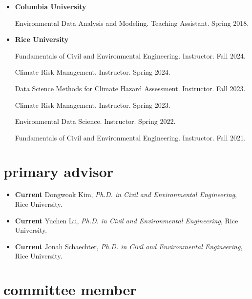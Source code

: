 \documentclass[10pt,oneside]{article}
\begin{document}
\begin{itemize}[label={}]
  
  \item \textbf{Columbia University}
        
        Environmental Data Analysis and Modeling. Teaching Assistant. Spring 2018.
        
        
  \item \textbf{Rice University}
        
        Fundamentals of Civil and Environmental Engineering. Instructor. Fall 2024.
        
        Climate Risk Management. Instructor. Spring 2024.
        
        Data Science Methods for Climate Hazard Assessment. Instructor. Fall 2023.
        
        Climate Risk Management. Instructor. Spring 2023.
        
        Environmental Data Science. Instructor. Spring 2022.
        
        Fundamentals of Civil and Environmental Engineering. Instructor. Fall 2021.
        
        
\end{itemize}


\section{primary advisor}

\mbox{}\vspace{-\dimexpr\baselineskip\relax}

\begin{itemize}[label={}]

  
    \item \textbf{Current} Dongwook Kim, \textit{Ph.D. in Civil and Environmental Engineering}, Rice University. 
  
    \item \textbf{Current} Yuchen Lu, \textit{Ph.D. in Civil and Environmental Engineering}, Rice University. 
  
    \item \textbf{Current} Jonah Schaechter, \textit{Ph.D. in Civil and Environmental Engineering}, Rice University. 
  
  
  
\end{itemize}

\section{committee member}
\end{document}

